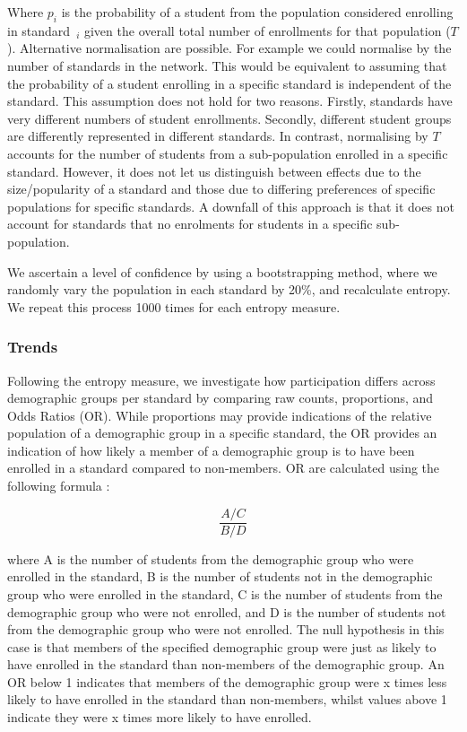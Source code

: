Where $p_i$ is the probability of a student from the population considered enrolling in standard~$_i$ given the overall total number of enrollments for that population ($T$). Alternative normalisation are possible. For example we could normalise by the number of standards in the network. This would be equivalent to assuming that the probability of a student enrolling in a specific standard is independent of the standard. This assumption does not hold for two reasons. Firstly, standards have very different numbers of student enrollments. Secondly, different student groups are differently represented in different standards. In contrast, normalising by $T$ accounts for the number of students from a sub-population enrolled in a specific standard. However, it does not let us distinguish between effects due to the size/popularity of a standard and those due to differing preferences of specific populations for specific standards. A downfall of this approach is that it does not account for standards that no enrolments for students in a specific sub-population.

We ascertain a level of confidence by using a bootstrapping method, where we randomly vary the population in each standard by 20\%, and recalculate entropy. We repeat this process 1000 times for each entropy measure. 
\subsubsection{Trends}
 

Following the entropy measure, we investigate how participation differs across demographic groups per standard by comparing raw counts, proportions, and Odds Ratios (OR). While proportions may provide indications of the relative population of a demographic group in a specific standard, the OR provides an indication of how likely a member of a demographic group is to have been enrolled in a standard compared to non-members. OR are calculated using the following formula \citep{field2012discovering}: 

    $$\frac{A/C}{B/D}$$

where A is the number of students from the demographic group who were enrolled in the standard, B is the number of students not in the demographic group who were enrolled in the standard, C is the number of students from the demographic group who were not enrolled, and D is the number of students not from the demographic group who were not enrolled. The null hypothesis in this case is that members of the specified demographic group were just as likely to have enrolled in the standard than non-members of the demographic group. An OR below 1 indicates that members of the demographic group were x times less likely to have enrolled in the standard than non-members, whilst values above 1 indicate they were x times more likely to have enrolled.


